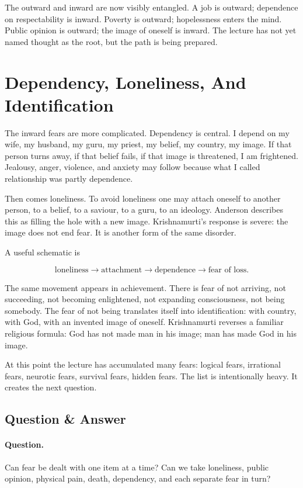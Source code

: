 The outward and inward are now visibly entangled. A job is outward; dependence on respectability is inward. Poverty is outward; hopelessness enters the mind. Public opinion is outward; the image of oneself is inward. The lecture has not yet named thought as the root, but the path is being prepared.

\section{Dependency, Loneliness, And Identification}

The inward fears are more complicated. Dependency is central. I depend on my wife, my husband, my guru, my priest, my belief, my country, my image. If that person turns away, if that belief fails, if that image is threatened, I am frightened. Jealousy, anger, violence, and anxiety may follow because what I called relationship was partly dependence.

Then comes loneliness. To avoid loneliness one may attach oneself to another person, to a belief, to a saviour, to a guru, to an ideology. Anderson describes this as filling the hole with a new image. Krishnamurti's response is severe: the image does not end fear. It is another form of the same disorder.

A useful schematic is

\begin{equation}
\text{loneliness}
\longrightarrow
\text{attachment}
\longrightarrow
\text{dependence}
\longrightarrow
\text{fear of loss}.
\end{equation}

The same movement appears in achievement. There is fear of not arriving, not succeeding, not becoming enlightened, not expanding consciousness, not being somebody. The fear of not being translates itself into identification: with country, with God, with an invented image of oneself. Krishnamurti reverses a familiar religious formula: God has not made man in his image; man has made God in his image.

At this point the lecture has accumulated many fears: logical fears, irrational fears, neurotic fears, survival fears, hidden fears. The list is intentionally heavy. It creates the next question.

\subsection{Question \& Answer}

\paragraph{Question.}
Can fear be dealt with one item at a time? Can we take loneliness, public opinion, physical pain, death, dependency, and each separate fear in turn?

